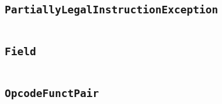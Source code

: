     \begin{landscape}
    \section{\texttt{PartiallyLegalInstructionException}}\label{code:PartiallyLegalInstructionException}
    \begin{multicols}{2} %
    \inputminted[mathescape,
        linenos,
        numbersep=5pt,
        frame=none,
        framesep=2mm,
        fontsize=\footnotesize]{java}{../src/main/java/se/filipallberg/dark/mips32decompiler/instruction/PartiallyLegalInstructionException.java}
    \end{multicols}
    \end{landscape}
    


    \begin{landscape}
    \section{\texttt{Field}}\label{code:Field}
    \begin{multicols}{2} %
    \inputminted[mathescape,
        linenos,
        numbersep=5pt,
        frame=none,
        framesep=2mm,
        fontsize=\footnotesize]{java}{../src/main/java/se/filipallberg/dark/mips32decompiler/instruction/type/RTypeInstruction/Field.java}
    \end{multicols}
    \end{landscape}
    


    \begin{landscape}
    \section{\texttt{OpcodeFunctPair}}\label{code:OpcodeFunctPair}
    \begin{multicols}{2} %
    \inputminted[mathescape,
        linenos,
        numbersep=5pt,
        frame=none,
        framesep=2mm,
        fontsize=\footnotesize]{java}{../src/main/java/se/filipallberg/dark/mips32decompiler/instruction/type/RTypeInstruction/OpcodeFunctPair.java}
    \end{multicols}
    \end{landscape}
    


